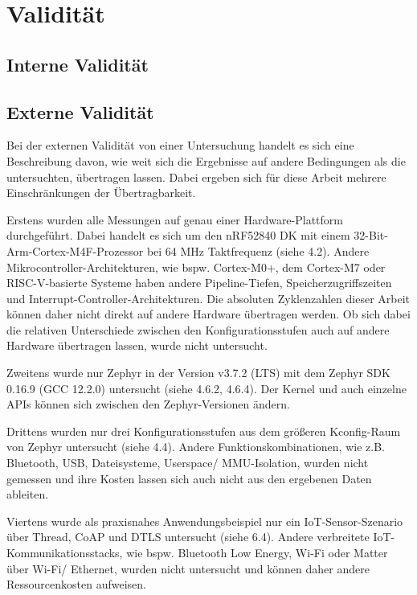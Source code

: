 \chapter{Validit{\"a}t}


\section{Interne Validit{\"a}t}

\section{Externe Validit{\"a}t}
Bei der externen Validit{\"a}t von einer Untersuchung handelt es sich eine Beschreibung davon, wie weit sich die Ergebnisse auf andere Bedingungen als die untersuchten, {\"u}bertragen lassen. Dabei ergeben sich f{\"u}r diese Arbeit mehrere Einschr{\"a}nkungen der {\"U}bertragbarkeit.

Erstens wurden alle Messungen auf genau einer Hardware-Plattform durchgef{\"u}hrt. Dabei handelt es sich um den nRF52840 DK mit einem 32-Bit-Arm-Cortex-M4F-Prozessor bei 64 MHz Taktfrequenz (siehe 4.2). Andere Mikrocontroller-Architekturen, wie bspw. Cortex-M0+, dem Cortex-M7 oder RISC-V-basierte Systeme haben andere Pipeline-Tiefen, Speicherzugriffszeiten und Interrupt-Controller-Architekturen. Die absoluten Zyklenzahlen dieser Arbeit k{\"o}nnen daher nicht direkt auf andere Hardware {\"u}bertragen werden. Ob sich dabei die relativen Unterschiede zwischen den Konfigurationsstufen auch auf andere Hardware {\"u}bertragen lassen, wurde nicht untersucht.

Zweitens wurde nur Zephyr in der Version v3.7.2 (LTS) mit dem Zephyr SDK 0.16.9 (GCC 12.2.0) untersucht (siehe 4.6.2, 4.6.4). Der Kernel und auch einzelne APIs k{\"o}nnen sich zwischen den Zephyr-Versionen {\"a}ndern.

Drittens wurden nur drei Konfigurationsstufen aus dem gr{\"o}{\ss}eren Kconfig-Raum von Zephyr untersucht (siehe 4.4). Andere Funktionskombinationen, wie z.B. Bluetooth, USB, Dateisysteme, Userspace/ MMU-Isolation, wurden nicht gemessen und ihre Kosten lassen sich auch nicht aus den ergebenen Daten ableiten.

Viertens wurde als praxisnahes Anwendungsbeispiel nur ein IoT-Sensor-Szenario {\"u}ber Thread, CoAP und DTLS untersucht (siehe 6.4). Andere verbreitete IoT-Kommunikationsstacks, wie bspw. Bluetooth Low Energy, Wi-Fi oder Matter {\"u}ber Wi-Fi/ Ethernet, wurden nicht untersucht und k{\"o}nnen daher andere Ressourcenkosten aufweisen.


